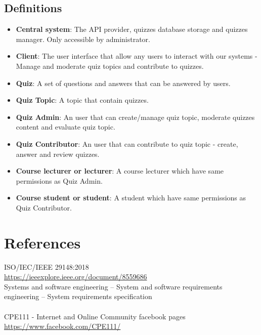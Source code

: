 \documentclass[ 10pt]{report}
\begin{document}
        \section{Definitions}
        \begin{itemize}
            \item \textbf{Central system}: The API provider, quizzes database storage and quizzes manager. Only accessible by administrator.
            \item \textbf{Client}: The user interface that allow any users to interact with our systems - Manage and moderate quiz topics and contribute to quizzes.
            \item \textbf{Quiz}: A set of questions and answers that can be answered by users.
            \item \textbf{Quiz Topic}: A topic that contain quizzes.
            \item \textbf{Quiz Admin}: An user that can create/manage quiz topic, moderate quizzes content and evaluate quiz topic.
            \item \textbf{Quiz Contributor}: An user that can contribute to quiz topic - create, answer and review quizzes.
            \item \textbf{Course lecturer or lecturer}: A course lecturer which have same permissions as Quiz Admin.
            \item \textbf{Course student or student}: A student which have same permissions as Quiz Contributor.
        \end{itemize}
    \pagebreak

    \chapter{References}
    \noindent ISO/IEC/IEEE 29148:2018 \\
    \href{https://ieeexplore.ieee.org/document/8559686}{https://ieeexplore.ieee.org/document/8559686} \\
    Systems and software engineering -- System and software requirements engineering -- System requirements specification \\\\

    \noindent CPE111 - Internet and Online Community facebook pages \\
    \href{https://www.facebook.com/CPE111/}{https://www.facebook.com/CPE111/} \\\\
\end{document}
